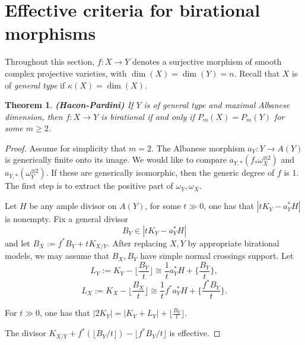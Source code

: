 \documentclass[10pt]{amsart}
\newtheorem{thm}{Theorem}[section]
\newcommand\alb{{ a}}
\newcommand\lra{\longrightarrow}
\newcommand\Alb{{ A}}
\newcommand\ot{{\otimes}}
\begin{document}
\newpage 
\section{Effective criteria for birational morphisms}
Throughout this section, $f:X\lra Y$ denotes a surjective
morphism of smooth complex projective varieties, with
$\dim (X)=\dim (Y)=n$. Recall that $X$ is of {\em general type} if 
$\kappa (X)=\dim (X)$.
\begin{thm}\label{birational} {\bf (Hacon-Pardini)} \cite{HP1}
 If $Y$ is of  general type and maximal Albanese dimension,
then $f:X\lra Y$ is birational if and only if $P_m(X)=P_m(Y)$ for some
$m\geq 2$.
\end{thm}
\begin{proof} Assume for simplicity that $m=2$. The Albanese morphism
$\alb _{Y}:Y\lra \Alb (Y)$ is generically finite onto its image. 
We would like to compare
$\alb_{Y,*}(f_* \omega _X ^{\ot 2})$ and $\alb _{Y,*}(\omega _Y^{\ot 2})$. If
these are generically isomorphic, then the generic degree
of $f$ is 1. The first step is to extract the positive part of 
$\omega _Y,\omega _X$.

Let $H$ be any ample divisor on $\Alb (Y)$, for some $t\gg 0$,
one has that $|tK_Y-\alb _Y^*H|$ is nonempty.
Fix a general divisor $$B_Y\in |tK_Y -\alb _Y^*H|$$ and let
$B_X:=f^*B_Y+tK_{X/Y}$.  After replacing $X,Y$ by appropriate birational 
models, we may  assume that $B_X,B_Y$ have simple normal crossings support.
Let $$L_Y:=K_Y-\lfloor \frac {B_Y}{t}\rfloor \cong \frac {1}{t}\alb _Y^*H+\{
\frac {B_Y}{t}\},$$
$$L_X:=K_X-\lfloor \frac {B_X}{t}\rfloor \cong \frac {1}{t}f^*\alb _Y^*H+\{
\frac {f^* B_Y}{t}\}.$$

 For $t\gg 0$, one has that $|2K_Y|=|K_Y+L_Y|
+\lfloor \frac
{B_Y}{t}\rfloor$.

\bigskip
{} The divisor $K_{X/Y}+f^*(\lfloor B_Y/t\rfloor )
-\lfloor f^*B_Y /t \rfloor$ is effective.


\end{proof}
\end{document}
